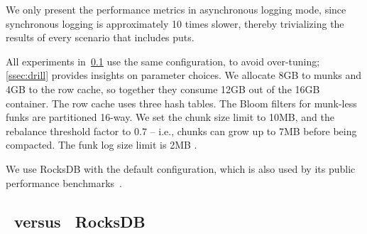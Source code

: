 We only present the performance metrics in asynchronous logging mode, since synchronous logging 
is approximately 10 times slower, thereby trivializing the results of every scenario that includes puts. 

All experiments in~\cref{ssec:results} use the same \sys\/ configuration, to avoid 
over-tuning; \cref{ssec:drill} provides insights on parameter choices.
We allocate 8GB to munks and 4GB to the row cache,
so together they consume 12GB out of the 16GB container. 
The row cache uses three hash tables.  
The Bloom filters for munk-less funks are partitioned 16-way.  
We set the \sys\/ chunk size limit to 10MB, and the rebalance threshold factor to $0.7$ -- i.e., 
chunks can grow up to 7MB  %
before being compacted. The funk log size limit is 2MB {}. 

We use RocksDB with the default configuration, which is also used by its public performance benchmarks~\cite{RocksDBPerf}.

\subsection{\sys\ versus \ RocksDB}
\label{ssec:results} 

